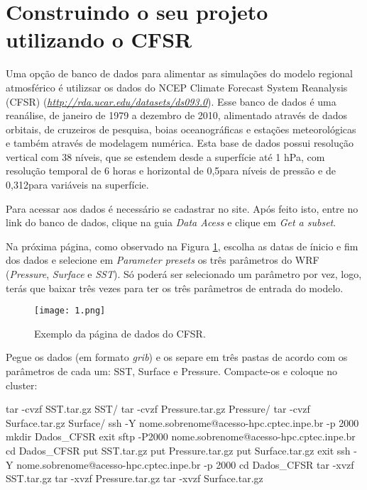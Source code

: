 \section{Construindo o seu projeto utilizando o CFSR}
\bigskip

\noindent Uma opção de banco de dados para alimentar as simulações do modelo regional atmosférico é utilizsar os dados do NCEP Climate Forecast System Reanalysis (CFSR) (\textcolor{bleu_cite}{\href{http://rda.ucar.edu/datasets/ds093.0}{\textit{http://rda.ucar.edu/datasets/ds093.0}}}). Esse banco de dados é uma reanálise, de janeiro de 1979 a dezembro de 2010, alimentado através de dados orbitais, de cruzeiros de pesquisa, boias oceanográficas e estações meteorológicas e também através de modelagem numérica. Esta base de dados possui resolução vertical com 38 níveis, que se estendem desde a superfície até 1 hPa, com resolução temporal de 6 horas e horizontal de 0,5\degree para níveis de pressão e de 0,312\degree para variáveis na superfície.
\bigskip

\noindent Para acessar aos dados é necessário se cadastrar no site. Após feito isto, entre no link do banco de dados, clique na guia \textit{Data Acess} e clique em \textit{Get a subset}.
\bigskip

\noindent Na próxima página, como observado na Figura \textcolor{bleu_cite}{\ref{detalhacfsr}}, escolha as datas de ínicio e fim dos dados e selecione em \textit{Parameter presets} os três parâmetros do WRF (\textit{Pressure}, \textit{Surface} e \textit{SST}). Só poderá ser selecionado um parâmetro por vez, logo, terás que baixar três vezes para ter os três parâmetros de entrada do modelo.
\bigskip

\begin{figure}[H]
    \centering
    \texttt{[image: 1.png]}
    \caption{Exemplo da página de dados do CFSR.}
    \label{detalhacfsr}
\end{figure}
\bigskip

\noindent Pegue os dados (em formato \textit{grib}) e os separe em três pastas de acordo com os parâmetros de cada um: SST, Surface e Pressure. Compacte-os e coloque no cluster:
\bigskip

\begin{bashcode}
tar -cvzf SST.tar.gz SST/
tar -cvzf Pressure.tar.gz Pressure/
tar -cvzf Surface.tar.gz Surface/
ssh -Y nome.sobrenome@acesso-hpc.cptec.inpe.br -p 2000
mkdir Dados_CFSR
exit
sftp -P2000 nome.sobrenome@acesso-hpc.cptec.inpe.br
cd Dados_CFSR
put SST.tar.gz
put Pressure.tar.gz
put Surface.tar.gz
exit
ssh -Y nome.sobrenome@acesso-hpc.cptec.inpe.br -p 2000
cd Dados_CFSR
tar -xvzf SST.tar.gz
tar -xvzf Pressure.tar.gz
tar -xvzf Surface.tar.gz
\end{bashcode}
\bigskip


